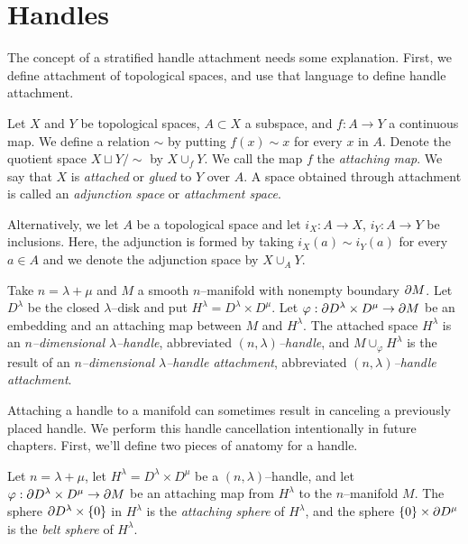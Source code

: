 \section{Handles}
\label{section:problem-handles}

The concept of a stratified handle attachment needs some explanation.
First, we define attachment of topological spaces, and use that language to define handle attachment.


\begin{defn}[Attachment]
	Let $X$ and $Y$ be topological spaces, $A\subset X$ a subspace, and $f:A\to Y$ a continuous map.
	We define a relation $\sim$ by putting $f(x)\sim x$ for every $x$ in $A$.
	Denote the quotient space $X\sqcup Y/\sim$ by $X\cup_f Y$.
	We call the map $f$ the \emph{attaching map}.  
	We say that $X$ is \emph{attached} or \emph{glued} to $Y$ over $A$.
	A space obtained through attachment is called an \emph{adjunction space} or \emph{attachment space}.
	
	Alternatively, we let $A$ be a topological space and let $i_X:A\to X$, $i_Y:A\to Y$ be inclusions.
	Here, the adjunction is formed by taking $i_X(a)\sim i_Y(a)$ for every $a\in A$ and we denote the adjunction space by $X\cup_A Y$.
\end{defn}

\begin{defn}[Handle]
	\label{def:handle}
	Take $n=\lambda+\mu$ and $M$ a smooth $n$--manifold with nonempty boundary $\partial M$.
	Let $D^\lambda$ be the closed $\lambda$--disk and put $H^\lambda = D^\lambda\times D^\mu$.
	Let $\varphi:\partial D^\lambda\times D^\mu\to\partial M$ be an embedding and an attaching map between $M$ and $H^\lambda$.
	The attached space $H^\lambda$ is an \emph{$n$--dimensional $\lambda$--handle}, abbreviated \emph{$(n,\lambda)$--handle}, and $M\cup_\varphi H^\lambda$ is the result of an \emph{$n$--dimensional $\lambda$--handle attachment}, abbreviated \emph{$(n,\lambda)$--handle attachment}.
\end{defn}

Attaching a handle to a manifold can sometimes result in canceling a previously placed handle.
We perform this handle cancellation intentionally in future chapters.
First, we'll define two pieces of anatomy for a handle.

\begin{defn}
	Let $n=\lambda+\mu$, let $H^\lambda=D^\lambda\times D^\mu$ be a $(n,\lambda)$--handle, and let $\varphi:\partial D^\lambda\times D^\mu\to\partial M$ be an attaching map from $H^\lambda$ to the $n$--manifold $M$.
	The sphere $\partial D^\lambda\times \{0\}$ in $H^\lambda$ is the \emph{attaching sphere} of $H^\lambda$, and the sphere $\{0\}\times \partial D^\mu$ is the \emph{belt sphere} of $H^\lambda$.	
\end{defn}

